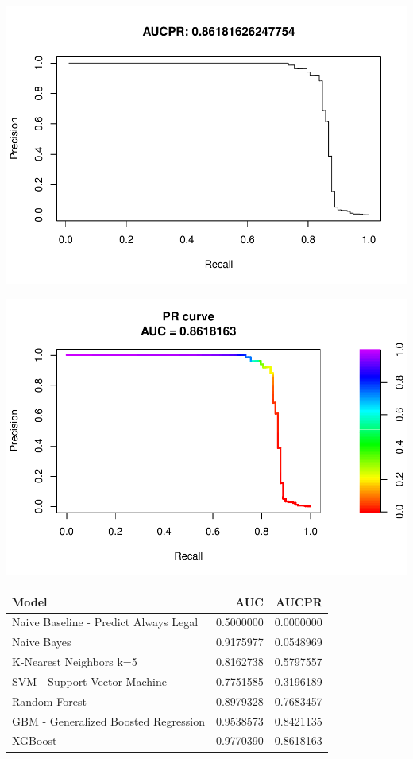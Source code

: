 \documentclass[]{article}
\begin{document}
\begin{center}\includegraphics{Credit_Card_Fraud_Detection_Project_Report_files/figure-latex/unnamed-chunk-22-3} \end{center}

\begin{center}\includegraphics{Credit_Card_Fraud_Detection_Project_Report_files/figure-latex/unnamed-chunk-22-4} \end{center}

\begin{table}[H]
\centering\begingroup\fontsize{10}{12}\selectfont

\begin{tabular}{l|r|r}
\hline
Model & AUC & AUCPR\\
\hline
Naive Baseline - Predict Always Legal & 0.5000000 & 0.0000000\\
\hline
Naive Bayes & 0.9175977 & 0.0548969\\
\hline
K-Nearest Neighbors k=5 & 0.8162738 & 0.5797557\\
\hline
SVM - Support Vector Machine & 0.7751585 & 0.3196189\\
\hline
Random Forest & 0.8979328 & 0.7683457\\
\hline
GBM - Generalized Boosted Regression & 0.9538573 & 0.8421135\\
\hline
XGBoost & 0.9770390 & 0.8618163\\
\hline
\end{tabular}
\endgroup{}
\end{table}
\end{document}
